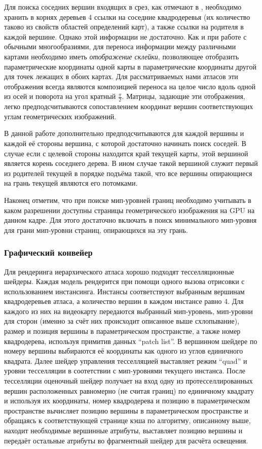 \documentclass[12pt]{extarticle}
\begin{document}
Для поиска соседних вершин входящих в срез, как отмечают в \cite{niski2007multi}, необходимо хранить в корнях деревьев 4 ссылки на соседние квадродеревья (их количество таково из свойств областей определений карт), а также ссылки на родителя в каждой вершине. Однако этой информации не достаточно. Как и при работе с обычными многообразиями, для переноса информации между различными картами необходимо иметь \emph{отображение склейки}, позволяющее отобразить параметрические координаты одной карты в параметрические координаты другой для точек лежащих в обоих картах. Для рассматриваемых нами атласов эти отображения всегда являются композицией переноса на целое число вдоль одной из осей и поворота на угол кратный $\frac{\pi}{2}$. Матрицы, задающие эти отображения, легко предподсчитываются сопоставлением координат вершин соответствующих углам геометрических изображений.

В данной работе дополнительно предподсчитываются для каждой вершины и каждой её стороны вершина, с которой достаточно начинать поиск соседей. В случае если с целевой стороны находится край текущей карты, этой вершиной является корень соседнего дерева. В ином случае такой вершиной служит первый из родителей текущей в порядке подъёма такой, что все вершины опирающиеся на грань текущей являются его потомками.

Наконец отметим, что при поиске мип-уровней границ необходимо учитывать в каком разрешении доступны страницы геометрического изображения на GPU на данном кадре. Для этого достаточно включать в поиск минимального мип-уровня для грани мип-уровни страниц, опирающихся на эту грань.

\subsubsection{Графический конвейер}
Для рендеринга иерархического атласа хорошо подходят тесселляционные шейдеры. Каждая модель рендерится при помощи одного вызова отрисовки с использованием инстансинга. Инстансы соответствуют выбранным вершинам квадродеревьев атласа, а количество вершин в каждом инстансе равно 4. Для каждого из них на видеокарту передаются выбранный мип-уровень, мип-уровни для сторон (именно за счёт них происходит описанное выше схлопывание), размер и позиция вершины в параметрическом пространстве, а также номер квадродерева, используя примитив данных ``patch list''. В вершинном шейдере по номеру вершины выбираются её координаты как одного из углов единичного квадрата. Далее шейдер управления тесселляцией выставляет режим ``quad'' и уровни тесселляции в соотетствии с мип-уровнями текущего инстанса. После тесселляции оценочный шейдер получает на вход одну из протесселлированных вершин расположенных равномерно (не считая границ) по единичному квадрату и используя их координаты, номер квадродерева и позицию в параметрическом пространстве вычисляет позицию вершины в параметрическом пространстве и обращаясь к соответствующей странице кэша по алгоритму, описанному выше, находит необходимые вершинные атрибуты, выставляет позицию вершины и передаёт остальные атрибуты во фрагментный шейдер для расчёта освещения.
\end{document}
